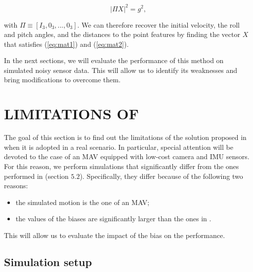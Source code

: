 \documentclass[letterpaper, 10 pt, conference]{ieeeconf}  %
\begin{document}
\begin{equation}
\label{eq:mat2}
| \Pi X | ^2 = g^2,
\end{equation}

\noindent with $\Pi \equiv [I_3, 0_3, ..., 0_3]$. We can therefore recover the initial velocity, the roll and pitch angles, and the distances to the point features
by finding the vector $X$ that satisfies (\ref{eq:mat1}) and (\ref{eq:mat2}).

In the next sections, we will evaluate the performance of this method on simulated noisy sensor data.
This will allow us to identify its weaknesses and bring modifications to overcome them.





\section{LIMITATIONS OF \cite{Martinelli2014}}\label{SectionBottlenecks}

The goal of this section is to find out the limitations of the solution proposed in \cite{Martinelli2014} when it is adopted in a real scenario. In particular, special attention will be devoted to the case of an MAV equipped with low-cost camera and IMU sensors. For this reason, we perform simulations that significantly differ from the ones performed in \cite{Martinelli2014} (section $5.2$). Specifically, they differ because of the following two reasons:
\begin{itemize}
\item the simulated motion is the one of an MAV;
\item the values of the biases are significantly larger than the ones in \cite{Martinelli2014}.
\end{itemize}
This will allow us to evaluate the impact of the bias on the performance.

\subsection{Simulation setup}\label{SubsectionConsidered}
\end{document}
